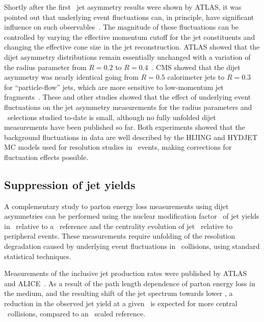 Shortly after the first \PbPb\ jet asymmetry results were shown by ATLAS, it was pointed out that
underlying event fluctuations can, in principle, have significant influence
on such observables~\cite{Cacciari:2011tm}. The magnitude of these fluctuations can be controlled
by varying the effective momentum cutoff for the jet constituents
and changing the effective cone size in the jet reconstruction. ATLAS showed that the dijet asymmetry
distributions remain essentially unchanged with a variation of the radius parameter from $R=0.2$
to $R=0.4$~\cite{Cole:2011zz}. CMS showed that the dijet asymmetry was nearly identical
going from $R=0.5$ calorimeter jets to $R=0.3$ for ``particle-flow'' jets, which are more sensitive
to low-momentum jet fragments~\cite{Nguyen:2011fg}. These and other studies showed that the effect
of underlying event fluctuations on the jet asymmetry measurements for the radius parameters
and \pT\ selections studied to-date is small, although no fully unfolded dijet measurements
have been published so far.  Both experiments showed that the
background fluctuations in data are well described by the HIJING and HYDJET MC models used
for resolution studies in \PbPb\ events, making corrections for fluctuation effects possible.

\subsection{Suppression of jet yields}

A complementary study to parton energy loss measurements using dijet asymmetries
can be performed using the nuclear modification factor \Raa\ of jet yields in \PbPb\ relative
to a \pp\ reference and the centrality evolution of jet \Rcp\ relative to peripheral events. These
measurements require unfolding of the resolution degradation caused by underlying event
fluctuations in \PbPb\ collisions, using standard statistical techniques.

Measurements of the inclusive jet production rates were published by ATLAS~\cite{Aad:2012is} and
ALICE~\cite{Abelev:2013kqa}.
As a result of the path length dependence of parton energy loss in the medium, and
the resulting shift of the jet spectrum towards lower \pT,
a reduction in the observed jet yield at a given \pT\ is expected for more
central \PbPb\ collisions, compared to an \Ncoll\ scaled reference.

